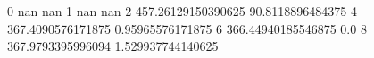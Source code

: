 0 nan nan
1 nan nan
2 457.26129150390625 90.8118896484375
4 367.4090576171875 0.95965576171875
6 366.44940185546875 0.0
8 367.9793395996094 1.529937744140625
